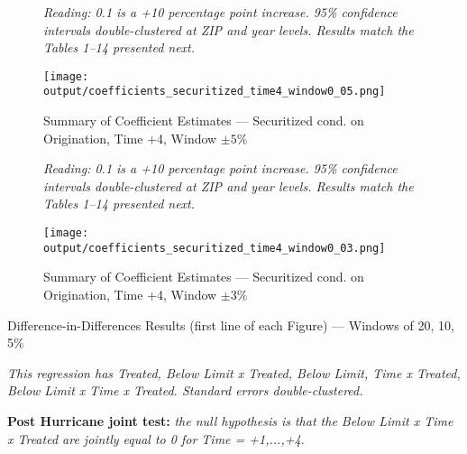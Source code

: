 \documentclass{article}
\begin{document}
\begin{figure}
    
    \caption{Summary of Coefficient Estimates --- Securitized cond. on Origination, Time +4, Window $\pm 5\%$}

    \emph{Reading: 0.1 is a +10 percentage point increase. 95\% confidence intervals double-clustered at ZIP and year levels. Results match the Tables 1--14 presented next.}

    \begin{center}
        \texttt{[image: output/coefficients\_securitized\_time4\_window0\_05.png]}
    \end{center}
    
\end{figure}
    
\clearpage
\pagebreak

\begin{figure}
    
    \caption{Summary of Coefficient Estimates --- Securitized cond. on Origination, Time +4, Window $\pm 3\%$}

    \emph{Reading: 0.1 is a +10 percentage point increase. 95\% confidence intervals double-clustered at ZIP and year levels. Results match the Tables 1--14 presented next.}

    \begin{center}
        \texttt{[image: output/coefficients\_securitized\_time4\_window0\_03.png]}
    \end{center}
    
\end{figure}
    
\clearpage
\pagebreak

\begin{sidewaystable}
    
    \caption{Difference-in-Differences Results (first line of each Figure) --- Windows of 20, 10, 5\%}
    
    \emph{This regression has Treated, Below Limit x Treated, Below Limit, Time x Treated, Below Limit x Time x Treated. Standard errors double-clustered.}

    \begin{center}
    
    \end{center}
    
    \textbf{Post Hurricane joint test:} \emph{the null hypothesis is that the Below Limit x Time x Treated are jointly equal to 0 for Time = +1,...,+4.}

\end{sidewaystable}
    
\end{document}
